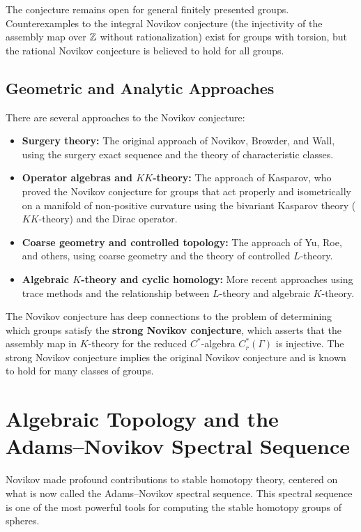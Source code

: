 The conjecture remains open for general finitely presented groups. Counterexamples to the integral Novikov conjecture (the injectivity of the assembly map over \(\mathbb{Z}\) without rationalization) exist for groups with torsion, but the rational Novikov conjecture is believed to hold for all groups.

\subsection{Geometric and Analytic Approaches}

There are several approaches to the Novikov conjecture:
\begin{itemize}
    \item \textbf{Surgery theory:} The original approach of Novikov, Browder, and Wall, using the surgery exact sequence and the theory of characteristic classes.
    \item \textbf{Operator algebras and \(KK\)-theory:} The approach of Kasparov, who proved the Novikov conjecture for groups that act properly and isometrically on a manifold of non-positive curvature using the bivariant Kasparov theory (\(KK\)-theory) and the Dirac operator.
    \item \textbf{Coarse geometry and controlled topology:} The approach of Yu, Roe, and others, using coarse geometry and the theory of controlled \(L\)-theory.
    \item \textbf{Algebraic \(K\)-theory and cyclic homology:} More recent approaches using trace methods and the relationship between \(L\)-theory and algebraic \(K\)-theory.
\end{itemize}

The Novikov conjecture has deep connections to the problem of determining which groups satisfy the \textbf{strong Novikov conjecture}, which asserts that the assembly map in \(K\)-theory for the reduced \(C^*\)-algebra \(C^*_r(\Gamma)\) is injective. The strong Novikov conjecture implies the original Novikov conjecture and is known to hold for many classes of groups.

\section{Algebraic Topology and the Adams--Novikov Spectral Sequence}

Novikov made profound contributions to stable homotopy theory, centered on what is now called the Adams--Novikov spectral sequence. This spectral sequence is one of the most powerful tools for computing the stable homotopy groups of spheres.

